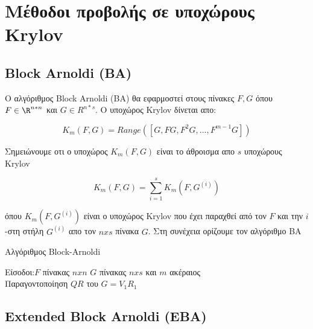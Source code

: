 ﻿
\chapter{Μέθοδοι προβολής σε υποχώρους Krylov}
\label{ch:5.chapterAlgorithms}

\section{\textlatin{Block Arnoldi (BA)}}
Ο αλγόριθμος \textlatin{Block Arnoldi (BA)} θα εφαρμοστεί στους πίνακες $F, G$ όπου $F \in \R^{n*n}$ και $G \in R^{n*s}$. Ο υποχώρος \textlatin{Krylov} δίνεται απο:

\begin{equation}
K_m(F,G) = Range([G, F G,F^2G,...,F^{m-1}G])
\end{equation}

Σημειώνουμε οτι ο υποχώρος $K_m(F,G)$ είναι το άθροισμα απο $s$ υποχώρους \textlatin{Krylov}

\begin{equation}
K_m(F,G) = \sum_{i=1}^{s}K_m(F,G^{(i)})
\end{equation}

όπου $K_m(F, G^{(i)})$ είναι ο υποχώρος \textlatin{Krylov} που έχει παραχθεί από τον $F$ και την $i$-στη στήλη $G^{(i)}$ απο τον $n x s$ πίνακα $G$.
Στη συνέχεια ορίζουμε τον αλγόριθμο ΒΑ ~\cite{heyouni2010extended, articleKrylovSubspaceMethods,jbilou2003block}

\begin{algorithm}[H]
    \SetAlgoLined
    \caption{ Αλγόριθμος  Block-Arnoldi}
    Είσοδοι:$F$ πίνακας $n x n$ $G$ πίνακας $n x s$ και $m$ ακέραιος\\
    Παραγοντοποίηση $QR$ του $G = V_1 R_1$\\
\end{algorithm}



\section{\textlatin{Extended Block Arnoldi (EBA)}} \label{EBA}

